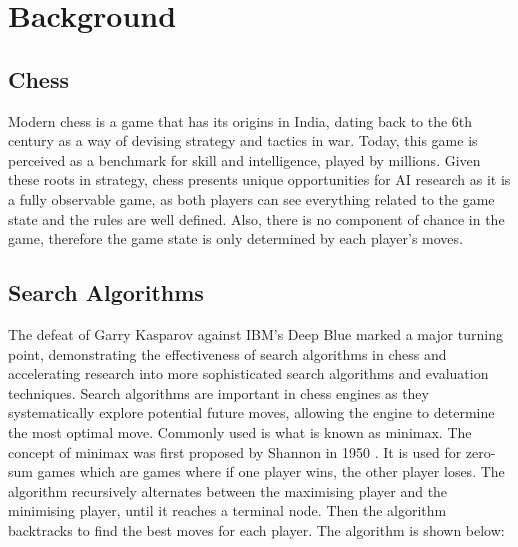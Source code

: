 \chapter{Background}
\section{Chess}
Modern chess is a game that has its origins in India, dating back to the 6th century 
as a way of devising strategy and tactics in war. Today, this game is perceived as a benchmark for skill and intelligence, played by millions. Given these roots in strategy, chess presents unique opportunities for AI research as it is a fully observable game, as both players can see everything related to the game state and the rules are well defined. Also, there is no component of chance in the game, therefore the game state is only determined by each player's moves.


\section{Search Algorithms}

The defeat of Garry Kasparov against IBM's Deep Blue marked a major turning point, demonstrating the effectiveness of search algorithms in chess and accelerating research into more sophisticated search algorithms and evaluation techniques. Search algorithms are important in chess engines as they systematically explore potential future moves, allowing the engine to determine the most optimal move. Commonly used is what is known as minimax. The concept of minimax was first proposed by Shannon in 1950 \cite{shannonXXIIProgrammingComputer1950}.
It is used for zero-sum games which are games where if one player wins, the other player loses. The algorithm recursively alternates between the maximising player and the minimising player, until it reaches a terminal node. Then the algorithm backtracks to find the best moves for each player. The algorithm is shown below:


